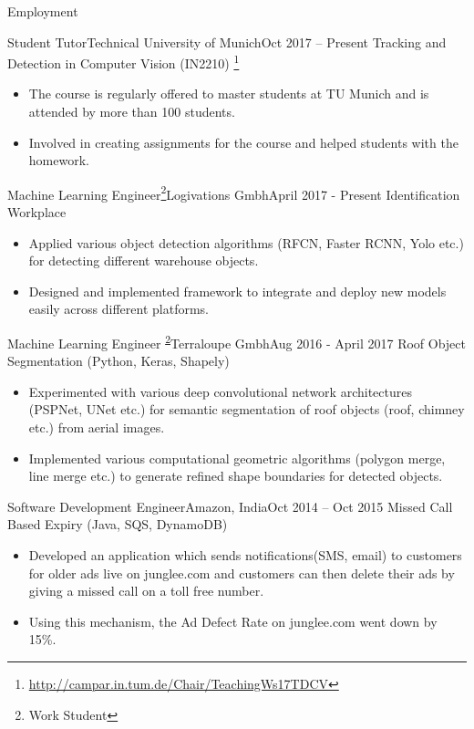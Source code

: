 \documentclass[]{mcdowellcv}
\begin{document}
	\begin{cvsection}{Employment}
	
			\begin{cvsubsection}{Student Tutor}{Technical University of Munich}{Oct 2017 -- Present}	
		Tracking and Detection in Computer Vision (IN2210) \footnote{\href{http://campar.in.tum.de/Chair/TeachingWs17TDCV}{http://campar.in.tum.de/Chair/TeachingWs17TDCV}}
			\begin{itemize}
				\item The course is regularly offered to master students at TU Munich and is attended by more than 100 students. 
				\item Involved in creating assignments for the course and helped students with the homework. 
			\end{itemize}
		\end{cvsubsection}
	
		\begin{cvsubsection}{Machine Learning Engineer\footnote{Work Student\label{ws}}}{Logivations Gmbh}{April 2017 - Present}
			Identification Workplace			
			\begin{itemize}
				\item Applied various object detection algorithms (RFCN, Faster RCNN, Yolo etc.) for detecting different warehouse objects.
				\item Designed and implemented framework to integrate and deploy new models easily across different platforms.
			\end{itemize}
		\end{cvsubsection}
		
		\begin{cvsubsection}{Machine Learning Engineer \textsuperscript{\ref{ws}}}{Terraloupe Gmbh}{Aug 2016 - April 2017}
			Roof Object Segmentation (Python, Keras, Shapely)
			\begin{itemize}
				\item Experimented with various deep convolutional network architectures (PSPNet, UNet etc.) for semantic segmentation of roof objects (roof, chimney etc.) from aerial images.
				\item Implemented various computational geometric algorithms (polygon merge, line merge etc.) to generate refined shape boundaries for detected objects.
			\end{itemize}
		\end{cvsubsection}
		
		\begin{cvsubsection}{Software Development Engineer}{Amazon, India}{Oct 2014 -- Oct 2015}		
		Missed Call Based Expiry (Java, SQS, DynamoDB)
			\begin{itemize}
				\item Developed an application which sends notifications(SMS, email) to customers for older ads live on junglee.com and customers can then delete their ads by giving a missed call on a toll free number. 
                \item Using this mechanism, the Ad Defect Rate on junglee.com went down by 15\%.
			\end{itemize}
		\end{cvsubsection}
		

\end{cvsection}
\end{document}
